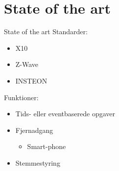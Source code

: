 \section{State of the art}
\begin{frame}{State of the art}{}
Standarder:
\begin{itemize}
\item X10
\item Z-Wave
\item INSTEON\newline
\end{itemize}
Funktioner:
\begin{itemize}
\item Tids- eller eventbaserede opgaver
\item Fjernadgang
\begin{itemize}
\item Smart-phone
\end{itemize}
\item Stemmestyring
\end{itemize}
\end{frame}

